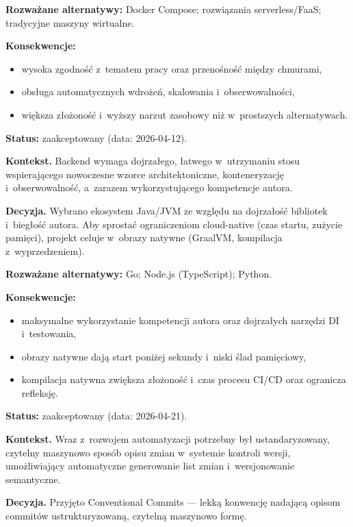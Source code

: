 \textbf{Rozważane alternatywy:} Docker Compose; rozwiązania serverless/FaaS; tradycyjne maszyny wirtualne.

\textbf{Konsekwencje:}
\begin{itemize}
  \item[$+$] wysoka zgodność z~tematem pracy oraz przenośność między chmurami,
  \item[$+$] obsługa automatycznych wdrożeń, skalowania i~obserwowalności,
  \item[$-$] większa złożoność i~wyższy narzut zasobowy niż w~prostszych alternatywach.
\end{itemize}


\textbf{Status:} zaakceptowany (data: 2026-04-12).

\textbf{Kontekst.} Backend wymaga dojrzałego, łatwego w~utrzymaniu stosu wspierającego nowoczesne wzorce architektoniczne, konteneryzację i~obserwowalność, a~zarazem wykorzystującego kompetencje autora.

\textbf{Decyzja.} Wybrano ekosystem Java/JVM ze względu na dojrzałość bibliotek i~biegłość autora. Aby sprostać ograniczeniom cloud-native (czas startu, zużycie pamięci), projekt celuje w~obrazy natywne (GraalVM, kompilacja z~wyprzedzeniem).

\textbf{Rozważane alternatywy:} Go; Node.js (TypeScript); Python.

\textbf{Konsekwencje:}
\begin{itemize}
  \item[$+$] maksymalne wykorzystanie kompetencji autora oraz dojrzałych narzędzi DI i~testowania,
  \item[$+$] obrazy natywne dają start poniżej sekundy i~niski ślad pamięciowy,
  \item[$-$] kompilacja natywna zwiększa złożoność i~czas procesu CI/CD oraz ogranicza refleksję.
\end{itemize}


\textbf{Status:} zaakceptowany (data: 2026-04-21).

\textbf{Kontekst.} Wraz z~rozwojem automatyzacji potrzebny był ustandaryzowany, czytelny maszynowo sposób opisu zmian w~systemie kontroli wersji, umożliwiający automatyczne generowanie list zmian i~wersjonowanie semantyczne.

\textbf{Decyzja.} Przyjęto Conventional Commits --- lekką konwencję nadającą opisom commitów ustrukturyzowaną, czytelną maszynowo formę.

